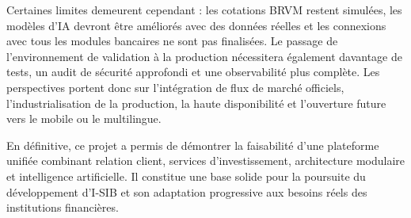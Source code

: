\documentclass[a4paper,12pt]{report}
\begin{document}
Certaines limites demeurent cependant : les cotations BRVM restent simulées, les
modèles d'IA devront être améliorés avec des données réelles et les connexions
avec tous les modules bancaires ne sont pas finalisées. Le passage de
l'environnement de validation à la production nécessitera également davantage
de tests, un audit de sécurité approfondi et une observabilité plus complète.
Les perspectives portent donc sur l'intégration de flux de marché officiels,
l'industrialisation de la production, la haute disponibilité et l'ouverture
future vers le mobile ou le multilingue.

En définitive, ce projet a permis de démontrer la faisabilité d'une plateforme
unifiée combinant relation client, services d'investissement, architecture
modulaire et intelligence artificielle. Il constitue une base solide pour la
poursuite du développement d'I-SIB et son adaptation progressive aux besoins
réels des institutions financières.
\end{document}
